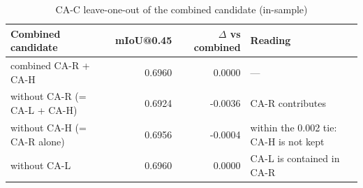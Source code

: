\begin{table}[H]\centering\scriptsize\setlength{\tabcolsep}{3pt}
\begin{tabular}{>{\raggedright\arraybackslash}p{4.83cm}rr>{\raggedright\arraybackslash}p{5.99cm}}
\toprule
Combined candidate & mIoU@0.45 & $\Delta$ vs combined & Reading \\
\midrule
combined CA-R + CA-H & 0.6960 & 0.0000 & --- \\
without CA-R (= CA-L + CA-H) & 0.6924 & -0.0036 & CA-R contributes \\
without CA-H (= CA-R alone) & 0.6956 & -0.0004 & within the 0.002 tie: CA-H is not kept \\
without CA-L & 0.6960 & 0.0000 & CA-L is contained in CA-R \\
\bottomrule
\end{tabular}
\caption{CA-C leave-one-out of the combined candidate (in-sample)}\label{tab:a3_ca_c_loo}
\end{table}
